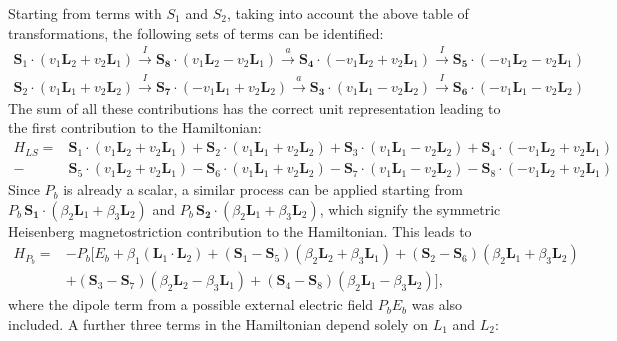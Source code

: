Starting from terms with $S_1$ and $S_2$, taking into account the above table of transformations, the following sets of terms can be identified:
\begin{align}
	\mathbf{S}_1\cdot(v_1 \mathbf{L}_2 + v_2 \mathbf{L}_1) \xrightarrow{I} \mathbf{S_8}\cdot(v_1 \mathbf{L}_2 - v_2 \mathbf{L}_1) \xrightarrow{a} \mathbf{S_4} \cdot (- v_1 \mathbf{L}_2 + v_2 \mathbf{L}_1) \xrightarrow{I} \mathbf{S_5} \cdot (-v_1 \mathbf{L}_2 - v_2 \mathbf{L}_1) \nonumber\\
	\mathbf{S}_2\cdot(v_1 \mathbf{L}_1 + v_2 \mathbf{L}_2) \xrightarrow{I} \mathbf{S_7}\cdot(-v_1 \mathbf{L}_1 + v_2 \mathbf{L}_2) \xrightarrow{a} \mathbf{S_3} \cdot (v_1 \mathbf{L}_1 - v_2 \mathbf{L}_2) \xrightarrow{I} \mathbf{S_6} \cdot (-v_1 \mathbf{L}_1 - v_2 \mathbf{L}_2) 
\end{align}
The sum of all these contributions has the correct unit representation leading to the first contribution to the Hamiltonian:
\begin{align}
    H_{LS} =& \mathbf{S}_1 \cdot (v_1 \mathbf{L}_2 + v_2 \mathbf{L}_1) + \mathbf{S}_2 \cdot (v_1 \mathbf{L}_1 + v_2 \mathbf{L}_2) + \mathbf{S}_3 \cdot (v_1 \mathbf{L}_1 - v_2 \mathbf{L}_2) + \mathbf{S}_4 \cdot (-v_1 \mathbf{L}_2 + v_2 \mathbf{L}_1) \nonumber\\
    -&\mathbf{S}_5 \cdot (v_1 \mathbf{L}_2 + v_2 \mathbf{L}_1) - \mathbf{S}_6 \cdot (v_1 \mathbf{L}_1 + v_2 \mathbf{L}_2) - \mathbf{S}_7 \cdot (v_1 \mathbf{L}_1 - v_2 \mathbf{L}_2) - \mathbf{S}_8 \cdot (-v_1 \mathbf{L}_2 + v_2 \mathbf{L}_1)
\end{align}
Since $P_b$ is already a scalar, a similar process can be applied starting from $P_b \, \mathbf{S_1}\cdot(\beta_2 \mathbf{L}_1 + \beta_3 \mathbf{L}_2)$ and $P_b\, \mathbf{S_2}\cdot(\beta_2 \mathbf{L}_1 + \beta_3 \mathbf{L}_2)$, which signify the symmetric Heisenberg magnetostriction contribution to the Hamiltonian. This leads to
\begin{align}
	H_{P_b}=&-P_b[E_b + \beta_1 (\mathbf{L}_1\cdot \mathbf{L}_2)+
    (\mathbf{S}_1-\mathbf{S}_5)(\beta_2 \mathbf{L}_2 + \beta_3 \mathbf{L}_1) +
    (\mathbf{S}_2-\mathbf{S}_6)(\beta_2 \mathbf{L}_1 + \beta_3 \mathbf{L}_2) \nonumber\\ 
    &+(\mathbf{S}_3-\mathbf{S}_7)(\beta_2 \mathbf{L}_2 - \beta_3 \mathbf{L}_1) +
    (\mathbf{S}_4-\mathbf{S}_8)(\beta_2 \mathbf{L}_1 - \beta_3 \mathbf{L}_2)],
\end{align}
where the dipole term from a possible external electric field $P_b E_b$ was also included. 
A further three terms in the Hamiltonian depend solely on $L_1$ and $L_2$:
